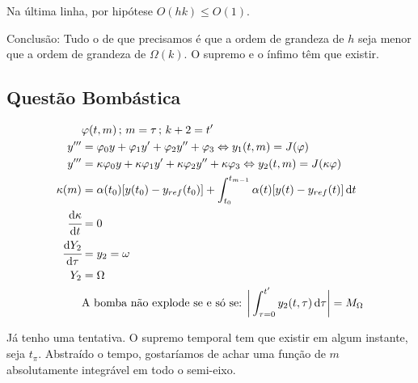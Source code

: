 \documentclass[12pt]{article}
\begin{document}
Na \'ultima linha, por hip\'otese $O(hk) \le O(1)$.

Conclus\~ao: Tudo o de que precisamos \'e que a ordem de grandeza de $h$ seja menor que a ordem de grandeza de $\Omega(k)$. O supremo e o \'infimo t\^em que existir.

\subsection{Quest\~ao Bomb\'astica}

\begin{align}
&\varphi(t, m)\,;\,m = \tau\,;\,k + 2 = t' \\
y''' &= \varphi_0 y + \varphi_1 y' + \varphi_2 y'' + \varphi_3 \Leftrightarrow y_1(t,m) = J(\varphi) \\
y''' &= \kappa \varphi_0 y + \kappa \varphi_1 y' + \kappa \varphi_2 y'' + \kappa \varphi_3 \Leftrightarrow y_2(t,m) = J(\kappa \varphi) \\
\kappa(m) &= \alpha(t_0) [y(t_0) - y_{ref}(t_0)] + \int_{t_0}^{t_{m-1}} \alpha(t) [y(t) - y_{ref}(t)]\,\mathrm{d}t \\
\cfrac{\mathrm{d}\kappa}{\mathrm{d}t} &= 0 \\
\cfrac{\mathrm{d}Y_2}{\mathrm{d}\tau} &= y_2 = \omega \\
Y_2 &= \Omega \\
&\text{A bomba n\~ao explode se e s\'o se: }\bigg| \int_{\tau = 0}^{t'} y_2(t, \tau)\,\mathrm{d}\tau \bigg| = M_{\Omega}
\end{align}

J\'a tenho uma tentativa. O supremo temporal tem que existir em algum instante, seja $t_{\pi}$. Abstra\'ido o tempo, gostar\'iamos de achar uma fun\c{c}\~ao de $m$ absolutamente integr\'avel em todo o semi-eixo.
\end{document}
